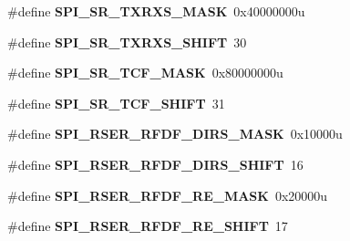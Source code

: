 \begin{DoxyCompactItemize}
\item 
\hypertarget{group___s_p_i___register___masks_ga82001e6d6fa1c1e51ab330a4d6b209c5}{}\#define {\bfseries S\+P\+I\+\_\+\+S\+R\+\_\+\+T\+X\+R\+X\+S\+\_\+\+M\+A\+S\+K}~0x40000000u\label{group___s_p_i___register___masks_ga82001e6d6fa1c1e51ab330a4d6b209c5}

\item 
\hypertarget{group___s_p_i___register___masks_ga596b82d7dd4fe7f24ea66c19a9413b96}{}\#define {\bfseries S\+P\+I\+\_\+\+S\+R\+\_\+\+T\+X\+R\+X\+S\+\_\+\+S\+H\+I\+F\+T}~30\label{group___s_p_i___register___masks_ga596b82d7dd4fe7f24ea66c19a9413b96}

\item 
\hypertarget{group___s_p_i___register___masks_ga3142ac7389c847b78c8f42e6bad5eec1}{}\#define {\bfseries S\+P\+I\+\_\+\+S\+R\+\_\+\+T\+C\+F\+\_\+\+M\+A\+S\+K}~0x80000000u\label{group___s_p_i___register___masks_ga3142ac7389c847b78c8f42e6bad5eec1}

\item 
\hypertarget{group___s_p_i___register___masks_ga4edd10f93f07c7b2edfbac31c1d4ebf5}{}\#define {\bfseries S\+P\+I\+\_\+\+S\+R\+\_\+\+T\+C\+F\+\_\+\+S\+H\+I\+F\+T}~31\label{group___s_p_i___register___masks_ga4edd10f93f07c7b2edfbac31c1d4ebf5}

\item 
\hypertarget{group___s_p_i___register___masks_ga10709e9e15464e94d63f2034df58cd32}{}\#define {\bfseries S\+P\+I\+\_\+\+R\+S\+E\+R\+\_\+\+R\+F\+D\+F\+\_\+\+D\+I\+R\+S\+\_\+\+M\+A\+S\+K}~0x10000u\label{group___s_p_i___register___masks_ga10709e9e15464e94d63f2034df58cd32}

\item 
\hypertarget{group___s_p_i___register___masks_ga1abe68cebab13a4018f43162098e4cd6}{}\#define {\bfseries S\+P\+I\+\_\+\+R\+S\+E\+R\+\_\+\+R\+F\+D\+F\+\_\+\+D\+I\+R\+S\+\_\+\+S\+H\+I\+F\+T}~16\label{group___s_p_i___register___masks_ga1abe68cebab13a4018f43162098e4cd6}

\item 
\hypertarget{group___s_p_i___register___masks_ga5b78af7a1292fc0e0b4b39a92a4140b2}{}\#define {\bfseries S\+P\+I\+\_\+\+R\+S\+E\+R\+\_\+\+R\+F\+D\+F\+\_\+\+R\+E\+\_\+\+M\+A\+S\+K}~0x20000u\label{group___s_p_i___register___masks_ga5b78af7a1292fc0e0b4b39a92a4140b2}

\item 
\hypertarget{group___s_p_i___register___masks_ga39481cbcda158bbfc6640eb07d0c2276}{}\#define {\bfseries S\+P\+I\+\_\+\+R\+S\+E\+R\+\_\+\+R\+F\+D\+F\+\_\+\+R\+E\+\_\+\+S\+H\+I\+F\+T}~17\label{group___s_p_i___register___masks_ga39481cbcda158bbfc6640eb07d0c2276}


\end{DoxyCompactItemize}
